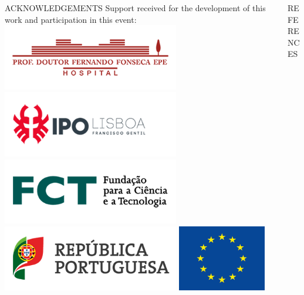 \documentclass[final]{beamer}
\begin{document}
\begin{frame}[t, fragile = singleslide]{}
\begin{columns}[t]
\begin{column}{0.45\textwidth}
\begin{block}{ACKNOWLEDGEMENTS}
\footnotesize
Support received for the development of this work and participation in this event:
\vfill
\includegraphics[height = 29mm]{./logos/logo005}
\hspace*{5mm}
\includegraphics[height = 29mm]{./logos/logo006}
\hspace*{5mm}
\includegraphics[height = 29mm]{./logos/logo007}
\hspace*{5mm}
\includegraphics[height = 29mm]{./logos/logo008}
\hspace*{5mm}
\includegraphics[height = 29mm]{./logos/logo009}
\end{block}

\end{column}

\begin{column}{0.45\textwidth}

\begin{block}{REFERENCES}
\printbibliography[heading = none]
\end{block}

\end{column}

\end{columns}

\end{frame}
\end{document}
